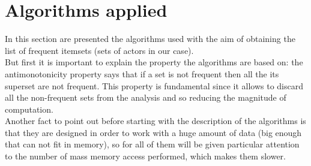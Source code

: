 \documentclass[14pt]{extarticle}
\begin{document}
\section{Algorithms applied}
In this section are presented the algorithms used with the aim of obtaining the list of frequent itemsets (sets of actors in our case).\\
But first it is important to explain the property the algorithms are based on:
the antimonotonicity property says that if a set is not frequent then all the its superset are not frequent. This property is fundamental since it allows to discard all the non-frequent sets from the analysis and so reducing the magnitude of computation.\\
Another fact to point out before starting with the description of the algorithms is that they are designed in order to work with a huge amount of data (big enough that can not fit in memory), so for all of them will be given particular attention to the number of mass memory access performed, which makes them slower.
\end{document}
